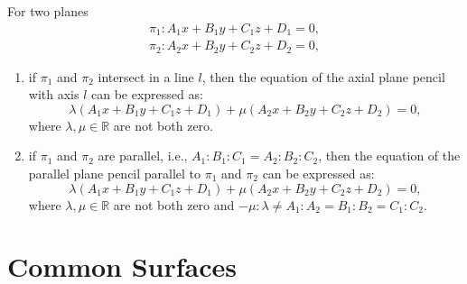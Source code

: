 \documentclass[11pt]{../../TexTemplate/elegantbook} %
\begin{document}
\begin{theorem}
    For two planes
    \begin{gather*}
        \pi_{1}: A_{1} x + B_{1} y + C_{1} z + D_{1} = 0, \\
        \pi_{2}: A_{2} x + B_{2} y + C_{2} z + D_{2} = 0,
    \end{gather*}
    \begin{enumerate}
        \item if \(\pi_{1}\) and \(\pi_{2}\) intersect in a line \(l\), 
            then the equation of the axial plane pencil with axis \(l\) can be expressed as:
            \[
            \lambda (A_{1} x + B_{1} y + C_{1} z + D_{1}) + \mu (A_{2} x + B_{2} y + C_{2} z + D_{2}) = 0,
            \]
            where \(\lambda, \mu \in \mathbb{R}\) are not both zero. 
        \item if \(\pi_{1}\) and \(\pi_{2}\) are parallel, i.e., \(A_{1} : B_{1} : C_{1} = A_{2} : B_{2} : C_{2}\),
            then the equation of the parallel plane pencil parallel to \(\pi_{1}\) and \(\pi_{2}\) can be expressed as:
            \[
            \lambda (A_{1} x + B_{1} y + C_{1} z + D_{1}) + \mu (A_{2} x + B_{2} y + C_{2} z + D_{2}) = 0,
            \]
            where \(\lambda, \mu \in \mathbb{R}\) are not both zero
            and \(-\mu:\lambda \neq A_{1}:A_{2} = B_{1}:B_{2} = C_{1}:C_{2}\).
    \end{enumerate}
\end{theorem}


\chapter{Common Surfaces}
\end{document}
